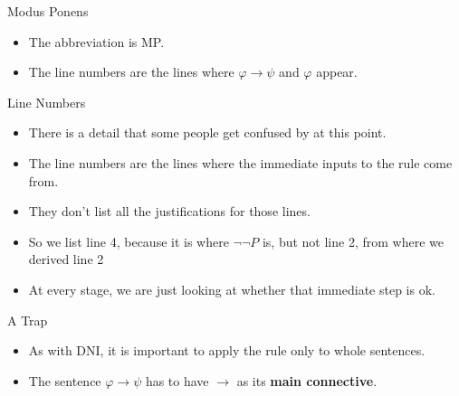 \documentclass[
  ignorenonframetext,
]{beamer}
\providecommand{\tightlist}{%
  \setlength{\itemsep}{0pt}\setlength{\parskip}{0pt}}
\renewcommand{\,}{\text{, }}
\begin{document}
\begin{frame}{Modus Ponens}
\protect\hypertarget{modus-ponens-2}{}

\begin{itemize}
\tightlist
\item
  The abbreviation is MP.
\item
  The line numbers are the lines where \(\varphi \rightarrow \psi\) and
  \(\varphi\) appear.
\end{itemize}

\end{frame}

\begin{frame}{Line Numbers}
\protect\hypertarget{line-numbers}{}

\begin{itemize}
\tightlist
\item
  There is a detail that some people get confused by at this point.
\item
  The line numbers are the lines where the immediate inputs to the rule
  come from.
\item
  They don't list all the justifications for those lines.
\item
  So we list line 4, because it is where \(\neg \neg P\) is, but not
  line 2, from where we derived line 2
\item
  At every stage, we are just looking at whether that immediate step is
  ok.
\end{itemize}

\end{frame}

\begin{frame}{A Trap}
\protect\hypertarget{a-trap-2}{}

\begin{itemize}
\tightlist
\item
  As with DNI, it is important to apply the rule only to whole
  sentences.
\item
  The sentence \(\varphi \rightarrow \psi\) has to have \(\rightarrow\)
  as its \textbf{main connective}.
\end{itemize}

\end{frame}
\end{document}
